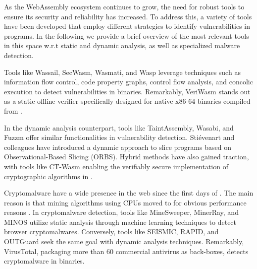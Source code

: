 \label{background:wasm:analysis}
As the WebAssembly ecosystem continues to grow, the need for robust tools to ensure its security and reliability has increased. 
To address this, a variety of tools have been developed that employ different strategies to identify vulnerabilities in \Wasm programs. 
In the following we provide a brief overview of the most relevant tools in this space w.r.t static and dynamic analysis, as well as specialized malware detection.

\vspace{10mm}
Tools like Wassail\cite{wassail}, SecWasm\cite{secwasm}, Wasmati\cite{wasmati}, and Wasp\cite{Wasp} leverage techniques such as information flow control, code property graphs, control flow analysis, and concolic execution to detect vulnerabilities in \wasm binaries. 
Remarkably, VeriWasm\cite{veriwasm} stands out as a static offline verifier specifically designed for native x86-64 binaries compiled from \Wasm. 


In the dynamic analysis counterpart, tools like TaintAssembly\cite{taintassembly}, Wasabi\cite{wasabi}, and Fuzzm\cite{fuzzm} offer similar functionalities in vulnerability detection. 
Stiévenart and colleagues have introduced a dynamic approach to slice \Wasm programs based on Observational-Based Slicing (ORBS)\cite{slicing, slicing2}. 
Hybrid methods have also gained traction, with tools like CT-Wasm\cite{ctwasm} enabling the verifiably secure implementation of cryptographic algorithms in \Wasm. 

 Cryptomalware have a wide presence in the web since the first days of \wasm.
The main reason is that mining algorithms using CPUs moved to \wasm for obvious performance reasons \cite{musch2019new}. 
In cryptomalware detection, tools like MineSweeper\cite{Minesweeper}, MinerRay\cite{MinerRay}, and MINOS\cite{MINOS} utilize static analysis through machine learning techniques to detect browser cryptomalwares. 
Conversely, tools like SEISMIC\cite{SEISMIC}, RAPID\cite{RAPID}, and OUTGuard\cite{outguard} seek the same goal with dynamic analysis techniques.
Remarkably, VirusTotal, packaging more than 60 commercial antivirus as back-boxes, detects cryptomalware in \wasm binaries.




